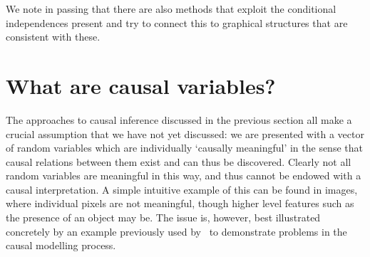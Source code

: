 We note in passing that there are also methods \cite{richardson1996automated} \cite{richardson1996discovery} that exploit the conditional independences present and try to connect this to graphical structures that are consistent with these.



\section{What are causal variables?}

The approaches to causal inference discussed in the previous section all make a crucial assumption that we have not yet discussed: we are presented with a vector of random variables which are individually `causally meaningful' in the sense that causal relations between them exist and can thus be discovered. 
Clearly not all random variables are meaningful in this way, and thus cannot be endowed with a causal interpretation.
A simple intuitive example of this can be found in images, where individual pixels are not meaningful, though higher level features such as the presence of an object may be.
The issue is, however, best illustrated concretely by an example previously used by~\cite{spirtes2004causal} to demonstrate problems in the causal modelling process.


